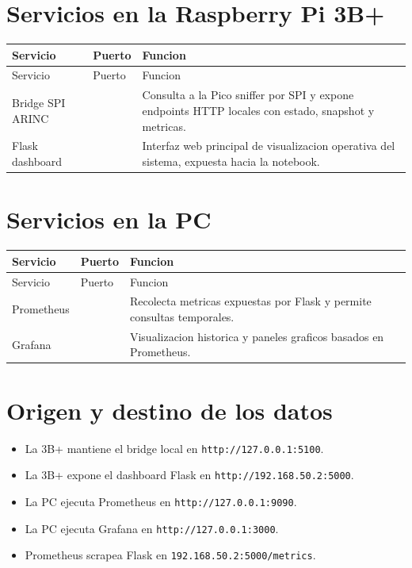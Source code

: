 \documentclass[12pt,a4paper]{report}
\begin{document}
\section{Servicios en la Raspberry Pi 3B+}

\begin{longtable}{>{\raggedright\arraybackslash}p{3cm} >{\raggedright\arraybackslash}p{2cm} >{\raggedright\arraybackslash}p{8cm}}
\toprule
Servicio & Puerto & Funcion \\
\midrule
\endfirsthead
\toprule
Servicio & Puerto & Funcion \\
\midrule
\endhead
Bridge SPI ARINC & 5100 & Consulta a la Pico sniffer por SPI y expone endpoints HTTP locales con estado, snapshot y metricas. \\
Flask dashboard & 5000 & Interfaz web principal de visualizacion operativa del sistema, expuesta hacia la notebook. \\
\bottomrule
\end{longtable}

\section{Servicios en la PC}

\begin{longtable}{>{\raggedright\arraybackslash}p{3cm} >{\raggedright\arraybackslash}p{2cm} >{\raggedright\arraybackslash}p{8cm}}
\toprule
Servicio & Puerto & Funcion \\
\midrule
\endfirsthead
\toprule
Servicio & Puerto & Funcion \\
\midrule
\endhead
Prometheus & 9090 & Recolecta metricas expuestas por Flask y permite consultas temporales. \\
Grafana & 3000 & Visualizacion historica y paneles graficos basados en Prometheus. \\
\bottomrule
\end{longtable}

\section{Origen y destino de los datos}

\begin{itemize}
    \item La 3B+ mantiene el bridge local en \texttt{http://127.0.0.1:5100}.
    \item La 3B+ expone el dashboard Flask en \texttt{http://192.168.50.2:5000}.
    \item La PC ejecuta Prometheus en \texttt{http://127.0.0.1:9090}.
    \item La PC ejecuta Grafana en \texttt{http://127.0.0.1:3000}.
    \item Prometheus scrapea Flask en \texttt{192.168.50.2:5000/metrics}.
\end{itemize}
\end{document}
